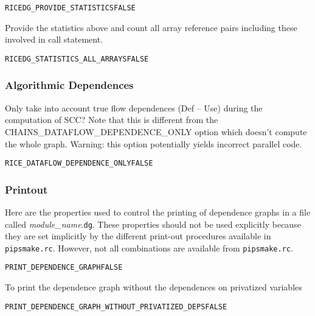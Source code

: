 \documentclass[a4paper]{report}
\newenvironment{PipsProp}{\begin{alltt}}{\end{alltt}}
\begin{document}
\begin{PipsProp}
RICEDG_PROVIDE_STATISTICS FALSE
\end{PipsProp}

Provide the statistics above and count all array reference pairs
including these involved in call statement.

\begin{PipsProp}
RICEDG_STATISTICS_ALL_ARRAYS FALSE
\end{PipsProp}

\subsubsection{Algorithmic Dependences}

Only take into account true flow dependences (Def -- Use) during the
computation of SCC?  Note that this is different from the
CHAINS\_DATAFLOW\_DEPENDENCE\_ONLY option which doesn't compute the
whole graph.  Warning: this option potentially yields incorrect parallel
code.

\begin{PipsProp}
RICE_DATAFLOW_DEPENDENCE_ONLY FALSE
\end{PipsProp}

\subsubsection{Printout}

Here are the properties used to control the printing of dependence
graphs in a file called {\em module\_name}.{\tt dg}. These properties
should not be used explicitly because they are set implicitly by the
different print-out procedures available in \verb/pipsmake.rc/. However,
not all combinations are available from \verb/pipsmake.rc/.

\begin{PipsProp}
PRINT_DEPENDENCE_GRAPH FALSE
\end{PipsProp}

To print the dependence graph without the dependences on privatized
variables

\begin{PipsProp}
PRINT_DEPENDENCE_GRAPH_WITHOUT_PRIVATIZED_DEPS FALSE
\end{PipsProp}
\end{document}
